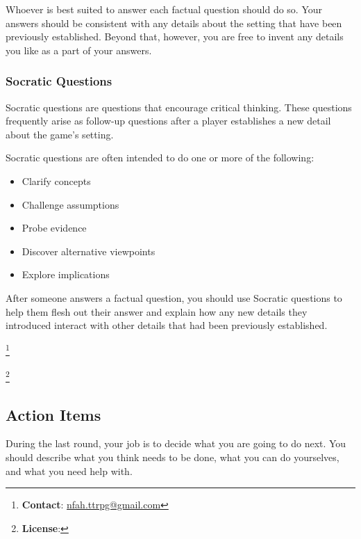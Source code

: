 \documentclass[a6paper, 11pt, parskip=half, DIV=15]{scrartcl}
\newcommand\blfootnote[1]{%
  \begingroup
  \renewcommand\thefootnote{}\footnote{#1}%
  \addtocounter{footnote}{-1}%
  \endgroup
}
\begin{document}
\vfill

Whoever is best suited to answer each factual question should do so.
Your answers should be consistent with any details about the setting that have been previously established.
Beyond that, however, you are free to invent any details you like as a part of your answers.

\newpage
\enlargethispage{1.75\baselineskip}

\subsubsection*{Socratic Questions}
Socratic questions are questions that encourage critical thinking.
These questions frequently arise as follow-up questions after a player establishes a new detail about the game's setting.

Socratic questions are often intended to do one or more of the following:
\begin{itemize}[nosep]
	\item Clarify concepts
	\item Challenge assumptions
	\item Probe evidence
	\item Discover alternative viewpoints
	\item Explore implications
\end{itemize}

After someone answers a factual question, you should use Socratic questions to help them flesh out their answer and explain how any new details they introduced interact with other details that had been previously established.

\blfootnote{\textbf{Contact}: \href{mailto:nfah.ttrpg@gmail.com}{nfah.ttrpg@gmail.com}}
\blfootnote{\textbf{License}: \doclicenseLongText}
%
%

\newpage
\enlargethispage{1.75\baselineskip}

\subsection*{Action Items}
During the last round, your job is to decide what you are going to do next.
You should describe what you think needs to be done, what you can do yourselves, and what you need help with.
\end{document}
